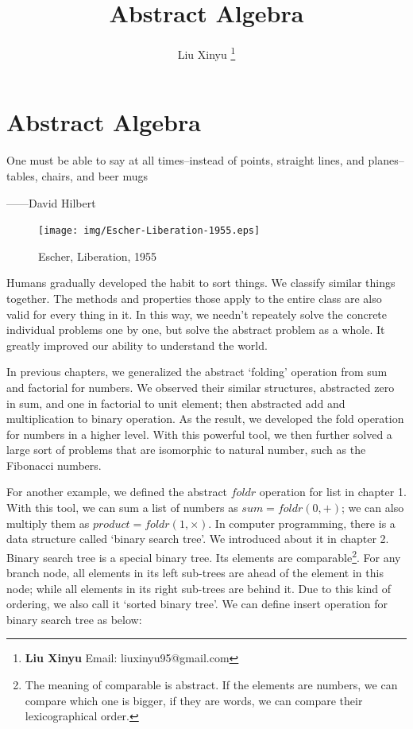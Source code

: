 \documentclass{article}
\begin{document}
\title{Abstract Algebra}

\author{Liu Xinyu
\thanks{{\bfseries Liu Xinyu} \newline
  Email: liuxinyu95@gmail.com \newline}}

\maketitle
\fi


\ifx\wholebook\relax
\chapter{Abstract Algebra}
\fi

\epigraph{One must be able to say at all times--instead of points, straight lines, and planes--tables, chairs, and beer mugs}{——David Hilbert}

\begin{figure}
 \centering
 \texttt{[image: img/Escher-Liberation-1955.eps]}
 \captionsetup{labelformat=empty}
 \caption{Escher, Liberation, 1955}
 \label{fig:Escher-liberation}
\end{figure}

Humans gradually developed the habit to sort things. We classify similar things together. The methods and properties those apply to the entire class are also valid for every thing in it. In this way, we needn't repeately solve the concrete individual problems one by one, but solve the abstract problem as a whole. It greatly improved our ability to understand the world.

In previous chapters, we generalized the abstract `folding' operation from sum and factorial for numbers. We observed their similar structures, abstracted zero in sum, and one in factorial to unit element; then abstracted add and multiplication to binary operation. As the result, we developed the fold operation for numbers in a higher level. With this powerful tool, we then further solved a large sort of problems that are isomorphic to natural number, such as the Fibonacci numbers.

For another example, we defined the abstract $foldr$ operation for list in chapter 1. With this tool, we can sum a list of numbers as $sum = foldr(0, +)$; we can also multiply them as $product = foldr(1, \times)$. In computer programming, there is a data structure called `binary search tree'. We introduced about it in chapter 2. Binary search tree is a special binary tree. Its elements are comparable\footnote{The meaning of comparable is abstract. If the elements are numbers, we can compare which one is bigger, if they are words, we can compare their lexicographical order.}. For any branch node, all elements in its left sub-trees are ahead of the element in this node; while all elements in its right sub-trees are behind it. Due to this kind of ordering, we also call it `sorted binary tree'. We can define insert operation for binary search tree as below:
\end{document}
